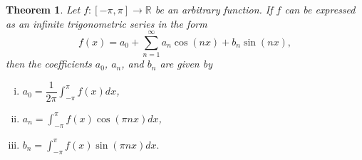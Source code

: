 \documentclass[11pt]{amsart}
\theoremstyle{plain}
\newtheorem{theorem}{Theorem}[section]
\theoremstyle{definition}
\newcommand{\R}{\mathbb R}
\begin{document}
\begin{theorem}
    Let $f:[-\pi,\pi]\to\R$ be an arbitrary function. If $f$ can be expressed as an infinite trigonometric series in the form 
    \begin{equation}
        \label{eqn:fourier}
        f(x) = a_0 + \sum_{n=1}^\infty a_n\cos(nx) + b_n\sin(nx),
        \end{equation}
    then the coefficients  $a_0$, $a_n$, and $b_n$ are given by
    \begin{enumerate}[(i)]
        \item $a_0=\dfrac{1}{2\pi}\int_{-\pi}^{\pi}f(x)dx$,
        \item $a_n=\int_{-\pi}^{\pi}f(x)\cos(\pi nx)dx$,
        \item $b_n=\int_{-\pi}^{\pi}f(x)\sin(\pi nx)dx.$
    \end{enumerate}
\end{theorem}
\end{document}
